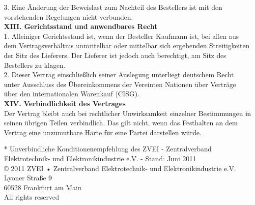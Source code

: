 \begin{multicols}{2}
\begin{scriptsize}
	3. Eine Änderung der Beweislast zum Nachteil des Bestellers ist mit den vorstehenden Regelungen nicht verbunden.\\
	\textbf{XIII. Gerichtsstand und anwendbares Recht}\\
	1. Alleiniger Gerichtsstand ist, wenn der Besteller Kaufmann ist, bei allen aus dem Vertragsverhältnis unmittelbar oder mittelbar sich ergebenden Streitigkeiten der Sitz des Lieferers. Der Lieferer ist jedoch auch berechtigt, am Sitz des Bestellers zu klagen.\\
	2. Dieser Vertrag einschließlich seiner Auslegung unterliegt deutschem Recht unter Ausschluss des Übereinkommens der Vereinten Nationen über Verträge über den internationalen Warenkauf (CISG).\\
	\textbf{XIV. Verbindlichkeit des Vertrages}\\
	Der Vertrag bleibt auch bei rechtlicher Unwirksamkeit einzelner Bestimmungen in seinen übrigen Teilen verbindlich. Das gilt nicht, wenn das Festhalten an dem Vertrag eine unzumutbare Härte für eine Partei darstellen würde.\\\newline
	
	* Unverbindliche Konditionenempfehlung des ZVEI - Zentralverband Elektrotechnik- und Elektronikindustrie e.V. - Stand: Juni 2011\\
	
	© 2011 ZVEI • Zentralverband Elektrotechnik- und Elektronikindustrie e.V.\\
	Lyoner Straße 9\\
	60528 Frankfurt am Main\\
	All rights reserved
	
	\end{scriptsize}
\end{multicols}